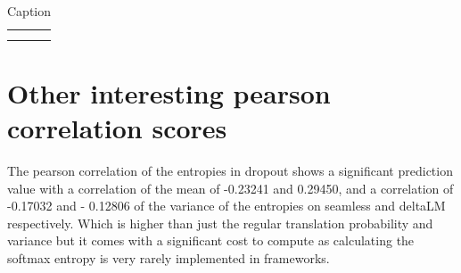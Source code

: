 \begin{table}[]
    \centering
    \begin{tabular}{c|c}
         &  \\
         & 
    \end{tabular}
    \caption{Caption}
    \label{seamlesse2enonesense}
\end{table}
    

\section{Other interesting pearson correlation scores}\label{dropout softmax entropy}

The pearson correlation of the entropies in dropout shows a significant prediction value with a correlation of the mean of -0.23241 and 0.29450, and a correlation of -0.17032 and - 0.12806 of the variance of the entropies on seamless and deltaLM respectively. Which is higher than just the regular translation probability and variance but it comes with a significant cost to compute as calculating the softmax entropy is very rarely implemented in frameworks.
